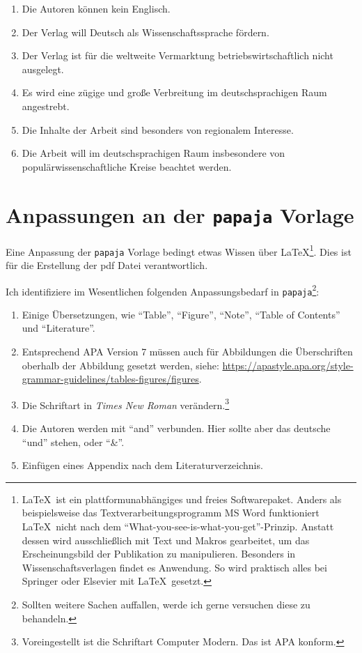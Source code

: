 \documentclass[
  doc,floatsintext]{apa6}
\providecommand{\tightlist}{%
  \setlength{\itemsep}{0pt}\setlength{\parskip}{0pt}}
\begin{document}
\begin{enumerate}
\def\labelenumi{\arabic{enumi}.}
\tightlist
\item
  Die Autoren können kein Englisch.
\item
  Der Verlag will Deutsch als Wissenschaftssprache fördern.
\item
  Der Verlag ist für die weltweite Vermarktung betriebswirtschaftlich nicht ausgelegt.
\item
  Es wird eine zügige und große Verbreitung im deutschsprachigen Raum angestrebt.
\item
  Die Inhalte der Arbeit sind besonders von regionalem Interesse.
\item
  Die Arbeit will im deutschsprachigen Raum insbesondere von populärwissenschaftliche Kreise beachtet werden.
\end{enumerate}

\hypertarget{anpassungen-an-der-papaja-vorlage}{%
\section{\texorpdfstring{Anpassungen an der \texttt{papaja} Vorlage}{Anpassungen an der papaja Vorlage}}\label{anpassungen-an-der-papaja-vorlage}}

Eine Anpassung der \texttt{papaja} Vorlage bedingt etwas Wissen über \LaTeX\footnote{\LaTeX~ist ein plattformunabhängiges und freies Softwarepaket. Anders als beispielsweise das Textverarbeitungsprogramm MS Word funktioniert \LaTeX~nicht nach dem ``What-you-see-is-what-you-get''-Prinzip. Anstatt dessen wird ausschließlich mit Text und Makros gearbeitet, um das Erscheinungsbild der Publikation zu manipulieren. Besonders in Wissenschaftsverlagen findet es Anwendung. So wird praktisch alles bei Springer oder Elsevier mit \LaTeX~gesetzt.}. Dies ist für die Erstellung der pdf Datei verantwortlich.

Ich identifiziere im Wesentlichen folgenden Anpassungsbedarf in \texttt{papaja}\footnote{Sollten weitere Sachen auffallen, werde ich gerne versuchen diese zu behandeln.}:

\begin{enumerate}
\def\labelenumi{\arabic{enumi}.}
\tightlist
\item
  Einige Übersetzungen, wie ``Table'', ``Figure'', ``Note'', ``Table of Contents'' und ``Literature''.
\item
  Entsprechend APA Version 7 müssen auch für Abbildungen die Überschriften oberhalb der Abbildung gesetzt werden, siehe: \url{https://apastyle.apa.org/style-grammar-guidelines/tables-figures/figures}.
\item
  Die Schriftart in \emph{Times New Roman} verändern.\footnote{Voreingestellt ist die Schriftart Computer Modern. Das ist APA konform.}
\item
  Die Autoren werden mit ``and'' verbunden. Hier sollte aber das deutsche ``und'' stehen, oder ``\&''.
\item
  Einfügen eines Appendix nach dem Literaturverzeichnis.
\end{enumerate}
\end{document}
